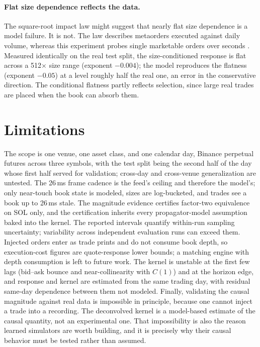 \documentclass[sigconf,anonymous]{acmart}
\begin{document}
\paragraph{Flat size dependence reflects the data.} The square-root impact law \citep{toth2011} might suggest that nearly flat size dependence is a model failure. It is not. The law describes metaorders executed against daily volume, whereas this experiment probes single marketable orders over seconds \citep{bouchaud2009}. Measured identically on the real test split, the size-conditioned response is flat across a 512$\times$ size range (exponent $-0.004$); the model reproduces the flatness (exponent $-0.05$) at a level roughly half the real one, an error in the conservative direction. The conditional flatness partly reflects selection, since large real trades are placed when the book can absorb them.

\section{Limitations}
\label{sec:limits}

The scope is one venue, one asset class, and one calendar day, Binance perpetual futures across three symbols, with the test split being the second half of the day whose first half served for validation; cross-day and cross-venue generalization are untested. The 26\,ms frame cadence is the feed's ceiling and therefore the model's; only near-touch book state is modeled, sizes are log-bucketed, and trades see a book up to 26\,ms stale. The magnitude evidence certifies factor-two equivalence on SOL only, and the certification inherits every propagator-model assumption baked into the kernel. The reported intervals quantify within-run sampling uncertainty; variability across independent evaluation runs can exceed them. Injected orders enter as trade prints and do not consume book depth, so execution-cost figures are quote-response lower bounds; a matching engine with depth consumption is left to future work. The kernel is unstable at the first few lags (bid--ask bounce and near-collinearity with $C(1)$) and at the horizon edge, and response and kernel are estimated from the same trading day, with residual same-day dependence between them not modeled. Finally, validating the causal magnitude against real data is impossible in principle, because one cannot inject a trade into a recording. The deconvolved kernel is a model-based estimate of the causal quantity, not an experimental one. That impossibility is also the reason learned simulators are worth building, and it is precisely why their causal behavior must be tested rather than assumed.
\end{document}
